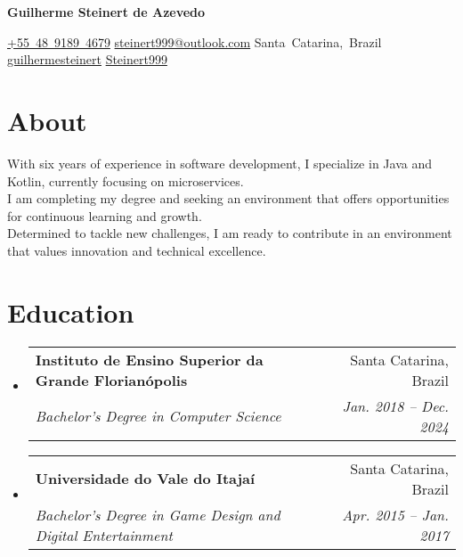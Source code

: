 \documentclass[letterpaper,11pt]{article}
\makeatletter
\newcommand{\resumeSubheading}[4]{
  \vspace{-1pt}\item
    \begin{tabular*}{0.97\textwidth}{l@{\extracolsep{\fill}}r}
      \textbf{#1} & #2 \\
      \textit{\small#3} & \textit{\small #4} \\
    \end{tabular*}\vspace{-5pt}
}
\newcommand{\resumeDescription}[1] {
  \vspace{0.25cm}
  \begin{adjustwidth}{0.5cm}{0.5cm}
    #1
  \end{adjustwidth}
}
\newcommand{\resumeSubHeadingListStart}{\begin{itemize}[leftmargin=*]}
\newcommand{\resumeSubHeadingListEnd}{\end{itemize}}
\newenvironment{header}{
  \setlength{\topsep}{0pt}\par\kern\topsep\centering\color{primaryColor}\linespread{1.5}
}{
  \par\kern\topsep
} %
\let\hrefWithoutArrow\href
\renewcommand{\href}[2]{\hrefWithoutArrow{#1}{\mbox{\ifthenelse{\equal{#2}{}}{ }{#2 }\raisebox{.15ex}{\footnotesize \faExternalLink*}}}}
\makeatother
\begin{document}
\begin{header}
\fontsize{30 pt}{30 pt}
\textbf{Guilherme Steinert de Azevedo}

\vspace{0.3 cm}

\normalsize
\mbox{\hrefWithoutArrow{tel:+5548991894679}{{\footnotesize\faPhone*}\hspace*{0.13cm}+55 48 9189 4679}}
\hspace*{1.25cm}
\mbox{\hrefWithoutArrow{mailto:steinert999@outlook.com}{{\small\faEnvelope[regular]}\hspace*{0.13cm}steinert999@outlook.com}}
\hspace*{1.25cm}
\mbox{{\small\faMapMarker*}\hspace*{0.13cm}Santa Catarina, Brazil}
\hspace*{1.25 cm}
\mbox{\hrefWithoutArrow{https://linkedin.com/in/guilhermesteinert}{{\small\faLinkedinIn}\hspace*{0.13cm}guilhermesteinert}}
\hspace*{1.25 cm}
\mbox{\hrefWithoutArrow{https://github.com/Steinert999}{{\small\faGithub}\hspace*{0.13cm}Steinert999}}
\hspace*{1.25 cm}
\end{header}
\section{About}
\resumeDescription{
  With six years of experience in software development, I specialize in Java and Kotlin, currently focusing on microservices.\\
  I am completing my degree and seeking an environment that offers opportunities for continuous learning and growth.\\
  Determined to tackle new challenges, I am ready to contribute in an environment that values innovation and technical excellence.
}
\section{Education}
  \resumeSubHeadingListStart
    \resumeSubheading
      {Instituto de Ensino Superior da Grande Florianópolis}{Santa Catarina, Brazil}
      {Bachelor's Degree in Computer Science}{Jan. 2018 -- Dec. 2024}
    \resumeSubheading
      {Universidade do Vale do Itajaí}{Santa Catarina, Brazil}
      {Bachelor's Degree in Game Design and Digital Entertainment}{Apr. 2015 -- Jan. 2017}
  \resumeSubHeadingListEnd
\end{document}
